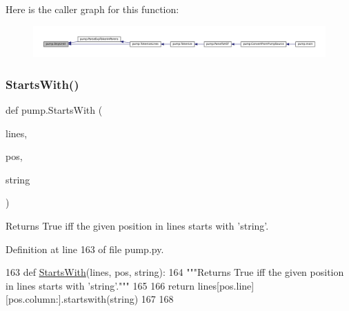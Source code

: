 Here is the caller graph for this function\+:
\nopagebreak
\begin{figure}[H]
\begin{center}
\leavevmode
\includegraphics[width=350pt]{namespacepump_a8935d04d89047866b07c59845e2d7d29_icgraph}
\end{center}
\end{figure}
\mbox{\label{namespacepump_a9353db466a97e632058887a77c3b26aa}} 
\subsubsection{\texorpdfstring{Starts\+With()}{StartsWith()}}
{\footnotesize\ttfamily def pump.\+Starts\+With (\begin{DoxyParamCaption}\item[{}]{lines,  }\item[{}]{pos,  }\item[{}]{string }\end{DoxyParamCaption})}

\begin{DoxyVerb}Returns True iff the given position in lines starts with 'string'.\end{DoxyVerb}
 

Definition at line 163 of file pump.\+py.


\begin{DoxyCode}
163 \textcolor{keyword}{def }\hyperlink{namespacepump_a9353db466a97e632058887a77c3b26aa}{StartsWith}(lines, pos, string):
164   \textcolor{stringliteral}{"""Returns True iff the given position in lines starts with 'string'."""}
165 
166   \textcolor{keywordflow}{return} lines[pos.line][pos.column:].startswith(string)
167 
168 
\end{DoxyCode}
\mbox{\label{namespacepump_a8c50cb40d65f26771c6f51eb265bb569}} 
